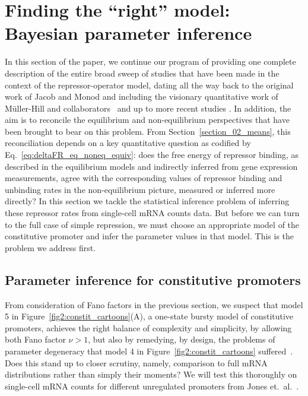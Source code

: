 \section{Finding the ``right'' model: Bayesian parameter inference}
\label{section_04_bayesian_inference}

In this section of the paper, we continue our program of providing one complete
description of the entire broad sweep of studies that have been made in the
context of the repressor-operator model, dating all the way back to the original
work of Jacob and Monod and including the visionary quantitative work of
M\"{u}ller-Hill and collaborators~\cite{Oehler1990} and up to more recent
studies \cite{Garcia2011a}. In addition, the aim is to reconcile the equilibrium
and non-equilibrium perspectives that have been brought to bear on this problem.
From Section~\ref{section_02_means}, this reconciliation depends on a key
quantitative question as codified by Eq.~\ref{eq:deltaFR_eq_noneq_equiv}: does
the free energy of repressor binding, as described in the equilibrium models and
indirectly inferred from gene expression measurements, agree with the
corresponding values of repressor binding and unbinding rates in the
non-equilibrium picture, measured or inferred more directly? In this section we
tackle the statistical inference problem of inferring these repressor rates from
single-cell mRNA counts data. But before we can turn to the full case of simple
repression, we must choose an appropriate model of the constitutive promoter and
infer the parameter values in that model. This is the problem we address first.


\subsection{Parameter inference for constitutive promoters}

From consideration of Fano factors in the previous section, we suspect that
model 5 in Figure~\ref{fig2:constit_cartoons}(A), a one-state bursty model of
constitutive promoters, achieves the right balance of complexity and simplicity,
by allowing both Fano factor $\nu>1$, but also by remedying, by design, the
problems of parameter degeneracy that model 4 in
Figure~\ref{fig2:constit_cartoons} suffered~\cite{Razo-Mejia2020}. Does this
stand up to closer scrutiny, namely, comparison to full mRNA distributions
rather than simply their moments? We will test this thoroughly on single-cell
mRNA counts for different unregulated promoters from Jones et.\
al.~\cite{Jones2014}.

